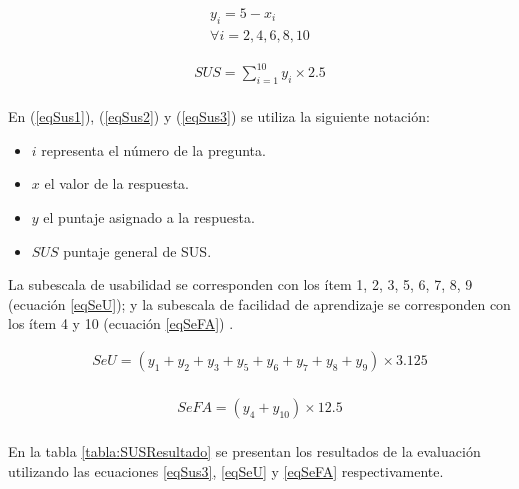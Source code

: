 \begin{equation} \label{eqSus2}
\begin{gathered}
y_{i} = 5 - x_{i} \\
\forall i = {2, 4, 6, 8, 10}
\end{gathered}
\end{equation} 
\hbox{}

\begin{equation} \label{eqSus3}
\begin{gathered}
SUS =  \sum_{i=1}^{10} y_{i} \times 2.5 \\
\end{gathered}
\end{equation} 

En (\ref{eqSus1}), (\ref{eqSus2}) y (\ref{eqSus3}) se utiliza la siguiente notación: 
\begin{itemize}
    \item $i$ representa el número de la pregunta.
    \item $x$ el valor de la respuesta.
    \item $y$ el puntaje asignado a la respuesta.
    \item $SUS$ puntaje general de SUS.
\end{itemize}


La subescala de usabilidad se corresponden con los ítem 1, 2, 3, 5, 6, 7, 8, 9 (ecuación \ref{eqSeU}); y la subescala de facilidad de aprendizaje se corresponden con los ítem 4 y 10 (ecuación \ref{eqSeFA}) \citep{Lewis2009TheScale}.

\begin{equation} \label{eqSeU}
\begin{gathered}
SeU = (y_{1} + y_{2} + y_{3} + y_{5} + y_{6} + y_{7} + y_{8} + y_{9}) \times 3.125 \\
\end{gathered}
\end{equation} 
\hbox{}

\begin{equation} \label{eqSeFA}
\begin{gathered}
SeFA = (y_{4} + y_{10}) \times 12.5 \\
\end{gathered}
\end{equation} 
\hbox{}

En la tabla \ref{tabla:SUSResultado} se presentan los resultados de la evaluación utilizando las ecuaciones \ref{eqSus3}, \ref{eqSeU} y \ref{eqSeFA} respectivamente.

